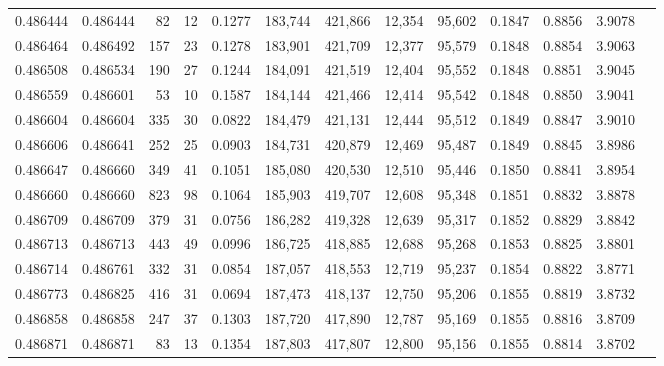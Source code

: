 \begin{tabular}{rrrrrrrrrrrrr}
0.486444 & 0.486444 &    82 &    12 &                                     0.1277 & 183,744 & 421,866 &  12,354 &  95,602 & 0.1847 & 0.8856 & 3.9078 \\
0.486464 & 0.486492 &   157 &    23 &                                     0.1278 & 183,901 & 421,709 &  12,377 &  95,579 & 0.1848 & 0.8854 & 3.9063 \\
0.486508 & 0.486534 &   190 &    27 &                                     0.1244 & 184,091 & 421,519 &  12,404 &  95,552 & 0.1848 & 0.8851 & 3.9045 \\
0.486559 & 0.486601 &    53 &    10 &                                     0.1587 & 184,144 & 421,466 &  12,414 &  95,542 & 0.1848 & 0.8850 & 3.9041 \\
0.486604 & 0.486604 &   335 &    30 &                                     0.0822 & 184,479 & 421,131 &  12,444 &  95,512 & 0.1849 & 0.8847 & 3.9010 \\
0.486606 & 0.486641 &   252 &    25 &                                     0.0903 & 184,731 & 420,879 &  12,469 &  95,487 & 0.1849 & 0.8845 & 3.8986 \\
0.486647 & 0.486660 &   349 &    41 &                                     0.1051 & 185,080 & 420,530 &  12,510 &  95,446 & 0.1850 & 0.8841 & 3.8954 \\
0.486660 & 0.486660 &   823 &    98 &                                     0.1064 & 185,903 & 419,707 &  12,608 &  95,348 & 0.1851 & 0.8832 & 3.8878 \\
0.486709 & 0.486709 &   379 &    31 &                                     0.0756 & 186,282 & 419,328 &  12,639 &  95,317 & 0.1852 & 0.8829 & 3.8842 \\
0.486713 & 0.486713 &   443 &    49 &                                     0.0996 & 186,725 & 418,885 &  12,688 &  95,268 & 0.1853 & 0.8825 & 3.8801 \\
0.486714 & 0.486761 &   332 &    31 &                                     0.0854 & 187,057 & 418,553 &  12,719 &  95,237 & 0.1854 & 0.8822 & 3.8771 \\
0.486773 & 0.486825 &   416 &    31 &                                     0.0694 & 187,473 & 418,137 &  12,750 &  95,206 & 0.1855 & 0.8819 & 3.8732 \\
0.486858 & 0.486858 &   247 &    37 &                                     0.1303 & 187,720 & 417,890 &  12,787 &  95,169 & 0.1855 & 0.8816 & 3.8709 \\
0.486871 & 0.486871 &    83 &    13 &                                     0.1354 & 187,803 & 417,807 &  12,800 &  95,156 & 0.1855 & 0.8814 & 3.8702 \\

\end{tabular}
